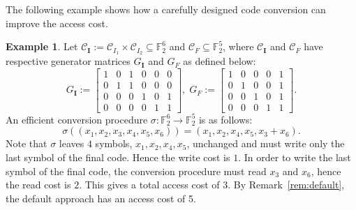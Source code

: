 \documentclass[conference, 10pt]{IEEEtran}
\theoremstyle{plain}
\theoremstyle{definition}
\newtheorem{example}[definition]{Example}
\newcommand{\numberset}{\mathbb}
\newcommand{\F}{\numberset{F}}
\newcommand{\mC}{\mathcal{C}}
\begin{document}
The following example shows how a carefully designed code conversion can improve the access cost.
\begin{example} \label{ex:conv}
   Let $\mC_{\mathbf{I}} := \mC_{I_1} \times \mC_{I_2} \subseteq \F_2^6$ and $\mC_F \subseteq \F_2^5$, where $\mC_{\mathbf{I}}$ and $\mC_F$ have respective generator matrices $G_{\mathbf{I}}$ and $G_F$ as defined below:
   \[
   G_{\mathbf{I}}
   :=
   \begin{bmatrix}
      1 & 0 & 1 & 0 & 0 & 0 \\
      0 & 1 & 1 & 0 & 0 & 0 \\
      0 & 0 & 0 & 1 & 0 & 1 \\
      0 & 0 & 0 & 0 & 1 & 1
   \end{bmatrix},
   \;
   G_F :=
   \begin{bmatrix}
      1 & 0 & 0 & 0 & 1 \\
      0 & 1 & 0 & 0 & 1 \\
      0 & 0 & 1 & 0 & 1 \\
      0 & 0 & 0 & 1 & 1
   \end{bmatrix}.
   \]
   An efficient conversion procedure $\sigma : \F_2^6 \rightarrow \F_2^5$ is as follows:
   \[
\sigma((x_1,x_2,x_3,x_4,x_5,x_6)) = (x_1, x_2, x_4,x_5,x_3+x_6).
   \]
   Note that $\sigma$ leaves $4$ symbols, $x_1, x_2, x_4, x_5$, unchanged and must write only the last symbol of the final code. Hence the write cost is $1$. In order to write the last symbol of the final code, the conversion procedure must read $x_3$ and $x_6$, hence the read cost is $2$. This gives a total access cost of $3$.
 By Remark~\ref{rem:default}, the default approach has an access cost of 5.
\end{example}



\end{document}
